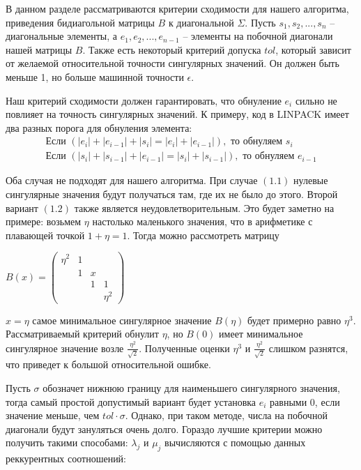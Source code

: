 В данном разделе рассматриваются критерии сходимости для нашего алгоритма, приведения бидиагольной матрицы $B$ к диагональной $\Sigma$. Пусть $s_1, s_2,...,s_n$ \--- диагональные элементы, а $e_1, e_2, ..., e_{n-1}$ \--- элементы на побочной диагонали нашей матрицы $B$. Также есть некоторый критерий допуска $tol$, который зависит от желаемой относительной точности сингулярных значений. Он должен быть меньше 1, но больше машинной точности $\epsilon$.

Наш критерий сходимости должен гарантировать, что обнуление $e_i$ сильно не повлияет на точность сингулярных значений. К примеру, код в LINPACK имеет два разных порога для обнуления элемента:
\begin{align}
\text{Если } (|e_i| + |e_{i-1}| + |s_i| = |e_i| + |e_{i-1}|), \text{ то обнуляем }s_i
\\\text{Если } (|s_i| + |s_{i-1}| + |e_{i-1}| = |s_i| + |s_{i-1}|), \text{ то обнуляем }e_{i-1}
\end{align}

Оба случая не подходят для нашего алгоритма. При случае $(1.1)$ нулевые сингулярные значения будут получаться там, где их не было до этого. Второй вариант $(1.2)$ также является неудовлетворительным. Это будет заметно на примере: возьмем $\eta$ настолько маленького значения, что в арифметике с плавающей точкой $1+\eta=1$. Тогда можно рассмотреть матрицу
\begin{center}
$B(x)=\begin{pmatrix}
    \eta^2&1&&\\
    &1&x\\
    &&1&1\\
    &&&\eta^2
\end{pmatrix}$
\end{center}

 $x=\eta$ самое минимальное сингулярное значение $B(\eta)$ будет примерно равно $\eta^3$. Рассматриваемый критерий обнулит $\eta$, но $B(0)$ имеет минимальное сингулярное значение возле $\frac{\eta^2}{\sqrt{2}}$. Полученные оценки $\eta^3$ и $\frac{\eta^2}{\sqrt{2}}$ слишком разнятся, что приведет к большой относительной ошибке.

Пусть $\sigma$ обозначет нижнюю границу для наименьшего сингулярного значения, тогда самый простой допустимый вариант будет установка $e_i$ равными 0, если значение меньше, чем $tol\cdot\sigma$. Однако, при таком методе, числа на побочной диагонали будут зануляться очень долго. Гораздо лучшие критерии можно получить такими способами:
$\lambda_j$ и $\mu_j$ вычисляются с помощью данных реккурентных соотношений:

